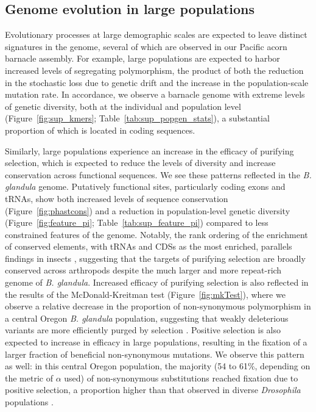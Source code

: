 \documentclass[11pt]{article}
\newcommand{\bgla}{\textit{B. glandula}\xspace}
\begin{document}
\subsection*{Genome evolution in large populations}

Evolutionary processes at large demographic scales are expected to leave distinct
signatures in the genome, several of which are observed in our Pacific acorn
barnacle assembly.
For example, large populations are expected to harbor increased levels of segregating
polymorphism, the product of both the reduction in the stochastic loss due to
genetic drift and the increase in the population-scale mutation rate.
In accordance, we observe a barnacle genome with extreme levels of genetic diversity,
both at the individual and population level (Figure~\ref{fig:sup_kmers};
Table~\ref{tab:sup_popgen_stats}), a substantial proportion of which is located in
coding sequences.
\vspace{0.2cm}

Similarly, large populations experience an increase in the efficacy of purifying
selection, which is expected to reduce the levels of diversity and increase 
conservation across functional sequences.
We see these patterns reflected in the \bgla{} genome.
Putatively functional sites, particularly coding exons and tRNAs, show both increased
levels of sequence conservation (Figure~\ref{fig:phastcons}) and a reduction in
population-level genetic diversity (Figure~\ref{fig:feature_pi};
Table~\ref{tab:sup_feature_pi}) compared to less constrained features of the genome.
Notably, the rank ordering of the enrichment of conserved elements, with tRNAs and CDSs
as the most enriched, parallels findings in insects \citep{siepel_evolutionarily_2005},
suggesting that the targets of purifying selection are broadly conserved across
arthropods despite the much larger and more repeat-rich genome of \bgla{}.
Increased efficacy of purifying selection is also reflected in the results of the
McDonald-Kreitman test (Figure~\ref{fig:mkTest}), where we observe a relative decrease
in the proportion of non-synonymous polymorphism in a central Oregon \bgla{} population,
suggesting that weakly deleterious variants are more efficiently purged by selection
\citep{li_reverse_2008}.
Positive selection is also expected to increase in efficacy in large populations,
resulting in the fixation of a larger fraction of beneficial non-synonymous mutations.
We observe this pattern as well: in this central Oregon population, the majority
(54 to 61\%, depending on the metric of $\alpha$ used) of non-synonymous substitutions
reached fixation due to positive selection, a proportion higher than that observed in
diverse \textit{Drosophila} populations \citep{haller_asymptoticmk_2017}.
\vspace{0.2cm}
\end{document}
